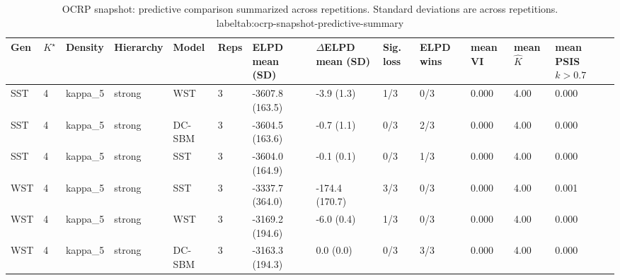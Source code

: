 \begin{table}[!h]
\centering
\caption{OCRP snapshot: predictive comparison summarized across repetitions. Standard deviations are across repetitions.\\label{tab:ocrp-snapshot-predictive-summary}}
\centering
\begin{tabular}[t]{lllllllllllll}
\toprule
Gen & $K^\star$ & Density & Hierarchy & Model & Reps & ELPD mean (SD) & $\Delta$ELPD mean (SD) & Sig. loss & ELPD wins & mean VI & mean $\hat K$ & mean PSIS $k>0.7$\\
\midrule
SST & 4 & kappa_5 & strong & WST & 3 & -3607.8 (163.5) & -3.9 (1.3) & 1/3 & 0/3 & 0.000 & 4.00 & 0.000\\
SST & 4 & kappa_5 & strong & DC-SBM & 3 & -3604.5 (163.6) & -0.7 (1.1) & 0/3 & 2/3 & 0.000 & 4.00 & 0.000\\
SST & 4 & kappa_5 & strong & SST & 3 & -3604.0 (164.9) & -0.1 (0.1) & 0/3 & 1/3 & 0.000 & 4.00 & 0.000\\
WST & 4 & kappa_5 & strong & SST & 3 & -3337.7 (364.0) & -174.4 (170.7) & 3/3 & 0/3 & 0.000 & 4.00 & 0.001\\
WST & 4 & kappa_5 & strong & WST & 3 & -3169.2 (194.6) & -6.0 (0.4) & 1/3 & 0/3 & 0.000 & 4.00 & 0.000\\
WST & 4 & kappa_5 & strong & DC-SBM & 3 & -3163.3 (194.3) & 0.0 (0.0) & 0/3 & 3/3 & 0.000 & 4.00 & 0.000\\
\bottomrule
\end{tabular}
\end{table}

